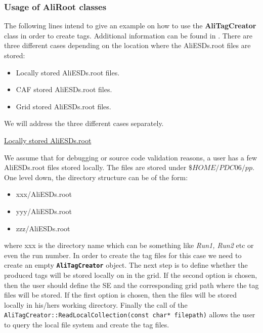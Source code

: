\documentclass[12pt,a4paper,twoside]{article}
\newcommand{\class}[1]{\texttt{\textbf{#1}}\xspace}
\newcommand{\method}[1]{\texttt{#1}\xspace}
\begin{document}
{\begin{itemize}
\end{itemize}

\subsubsection{Usage of AliRoot classes}

The following lines intend to give an example on how to use the
\textbf{AliTagCreator} class in order to create tags. Additional
information can be found in \cite{EventTagWeb}. There are three
different cases depending on the location where the AliESDs.root files
are stored:


\begin{itemize}

\item Locally stored AliESDs.root files.

\item CAF stored AliESDs.root files.

\item Grid stored AliESDs.root files.

\end{itemize}

We will address the three different cases separately.

\underline{Locally stored AliESDs.root}

We assume that for debugging or source code validation reasons, a user
has a few AliESDs.root files stored locally. The files are stored
under $\$HOME/PDC06/pp$. One level down, the directory structure can
be of the form:


\begin{itemize}

\item xxx/AliESDs.root
\item yyy/AliESDs.root
\item zzz/AliESDs.root

\end{itemize}

\noindent where xxx is the directory name which can be something like
\emph{Run1, Run2} etc or even the run number. In order to create the
tag files for this case we need to create an empty
\class{AliTagCreator} object. The next step is to define whether the
produced tags will be stored locally on in the grid. If the second
option is chosen, then the user should define the SE and the
corresponding grid path where the tag files will be stored. If the
first option is chosen, then the files will be stored locally in
his/hers working directory. Finally the call of the
\method{AliTagCreator::ReadLocalCollection(const char* filepath)}
allows the user to query the local file system and create the tag
files.


}
\end{document}
